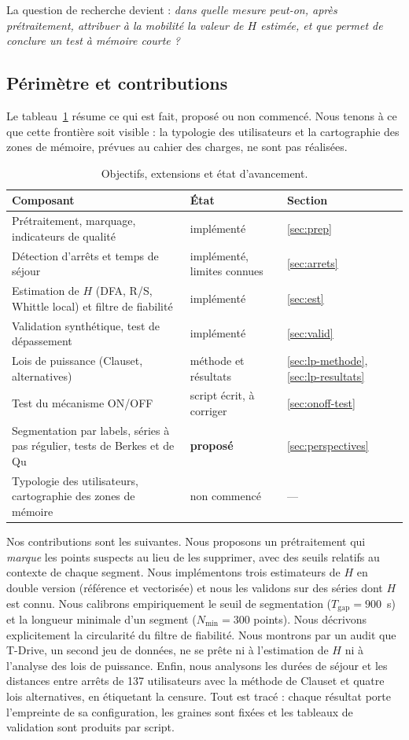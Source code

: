 \documentclass[11pt,a4paper]{article}
\renewcommand{\_}{\textunderscore\penalty0\hspace{0pt}}
\begin{document}
La question de recherche devient : \emph{dans quelle mesure peut-on, après prétraitement,
attribuer à la mobilité la valeur de $H$ estimée, et que permet de conclure un test à
mémoire courte ?}

\subsection{Périmètre et contributions}

Le tableau~\ref{tab:avancement} résume ce qui est fait, proposé ou non commencé. Nous
tenons à ce que cette frontière soit visible : la typologie des utilisateurs et la
cartographie des zones de mémoire, prévues au cahier des charges, ne sont pas réalisées.

\begin{table}[ht]
\centering
\caption{Objectifs, extensions et état d'avancement.}
\label{tab:avancement}
\small
\begin{tabular}{@{}p{8.2cm}p{4.6cm}p{1.6cm}@{}}
\toprule
Composant & État & Section \\
\midrule
Prétraitement, marquage, indicateurs de qualité & implémenté & \ref{sec:prep} \\
Détection d'arrêts et temps de séjour & implémenté, limites connues & \ref{sec:arrets} \\
Estimation de $H$ (DFA, R/S, Whittle local) et filtre de fiabilité & implémenté & \ref{sec:est} \\
Validation synthétique, test de dépassement & implémenté & \ref{sec:valid} \\
Lois de puissance (Clauset, alternatives) & méthode et résultats & \ref{sec:lp-methode}, \ref{sec:lp-resultats} \\
Test du mécanisme ON/OFF & script écrit, à corriger & \ref{sec:onoff-test} \\
Segmentation par labels, séries à pas régulier, tests de Berkes et de Qu & \textbf{proposé} & \ref{sec:perspectives} \\
Typologie des utilisateurs, cartographie des zones de mémoire & non commencé & --- \\
\bottomrule
\end{tabular}
\end{table}

Nos contributions sont les suivantes. Nous proposons un prétraitement qui \emph{marque} les
points suspects au lieu de les supprimer, avec des seuils relatifs au contexte de chaque
segment. Nous implémentons trois estimateurs de $H$ en double version (référence et
vectorisée) et nous les validons sur des séries dont $H$ est connu. Nous calibrons
empiriquement le seuil de segmentation ($T_{\mathrm{gap}}=900$~s) et la longueur minimale
d'un segment ($N_{\min}=300$ points). Nous décrivons explicitement la circularité du filtre
de fiabilité. Nous montrons par un audit que T-Drive, un second jeu de données, ne se prête
ni à l'estimation de $H$ ni à l'analyse des lois de puissance. Enfin, nous analysons les
durées de séjour et les distances entre arrêts de 137 utilisateurs avec la méthode de
Clauset et quatre lois alternatives, en étiquetant la censure. Tout est tracé : chaque
résultat porte l'empreinte de sa configuration, les graines sont fixées et les tableaux de
validation sont produits par script.
\end{document}
